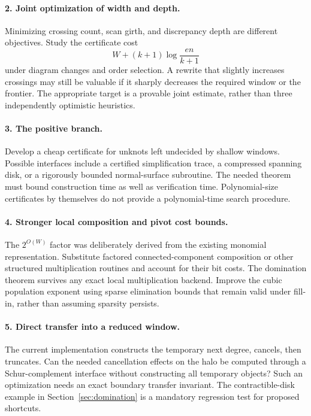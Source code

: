 \documentclass[11pt]{article}
\theoremstyle{definition}\newtheorem{definition}[theorem]{Definition}
\theoremstyle{remark}\newtheorem{remark}[theorem]{Remark}
\begin{document}
\paragraph{2. Joint optimization of width and depth.}
Minimizing crossing count, scan girth, and discrepancy depth are different objectives. Study the certificate cost
\[
 W+(k+1)\log\frac{en}{k+1}
\]
under diagram changes and order selection. A rewrite that slightly increases crossings may still be valuable if it sharply decreases the required window or the frontier. The appropriate target is a provable joint estimate, rather than three independently optimistic heuristics.

\paragraph{3. The positive branch.}
Develop a cheap certificate for unknots left undecided by shallow windows. Possible interfaces include a certified simplification trace, a compressed spanning disk, or a rigorously bounded normal-surface subroutine. The needed theorem must bound construction time as well as verification time. Polynomial-size certificates by themselves do not provide a polynomial-time search procedure.

\paragraph{4. Stronger local composition and pivot cost bounds.}
The $2^{O(W)}$ factor was deliberately derived from the existing monomial representation. Substitute factored connected-component composition or other structured multiplication routines and account for their bit costs. The domination theorem survives any exact local multiplication backend. Improve the cubic population exponent using sparse elimination bounds that remain valid under fill-in, rather than assuming sparsity persists.

\paragraph{5. Direct transfer into a reduced window.}
The current implementation constructs the temporary next degree, cancels, then truncates. Can the needed cancellation effects on the halo be computed through a Schur-complement interface without constructing all temporary objects? Such an optimization needs an exact boundary transfer invariant. The contractible-disk example in Section~\ref{sec:domination} is a mandatory regression test for proposed shortcuts.
\end{document}
